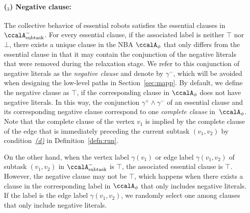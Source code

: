 \documentclass[Afour,sageh,times]{sagej}
\newcounter{mycounter}
\newcommand{\auto}[1]{\ccalA_{\textup{#1}}}
\newcommand{\autop}{\ccalA_{\phi}}
\begin{document}
{{   \paragraph{($_3$) Negative clause:} The collective behavior of essential robots satisfies the essential clauses in $\auto{subtask}^-$. For every essential clause, if the associated label is neither $\top$ nor $\bot$, there exists a unique clause in the NBA $\autop$ that only differs from the essential clause in that it may contain the conjunction of the negative literals that were removed during the relaxation stage. We refer to this conjunction of negative literals as the {\it negative clause} and denote by $\gamma^-$, which will be avoided when designing the low-level paths in Section~\ref{sec:mapp}. By default, we define the negative clause as $\top$, if the corresponding clause in $\autop$ does not have negative literals. In this way, the conjunction $\gamma^+ \wedge \gamma^-$ of an essential clause and its corresponding negative clause correspond to one {\it complete clause} in~$\autop$. Note that the complete clause of the vertex $v_1$ is implied by the complete clause of the edge that is immediately preceding the current subtask $(v_1, v_2)$ by condition~\hyperref[cond:d]{\it (d)} in Definition~\ref{defn:run}.

   On the other hand, when the vertex label $\gamma(v_1)$ or edge label $\gamma(v_1, v_2)$ of subtask $(v_1, v_2)$ in $\auto{subtask}^-$ is $\top$, the associated essential clause is $\top$. However, the negative clause may not be $\top$, which happens when there exists a  clause in the corresponding label in $\autop$ that only includes negative literals. If the label is the edge label $\gamma(v_1, v_2)$, we randomly select one among clauses that only include negative literals. }}
\end{document}
